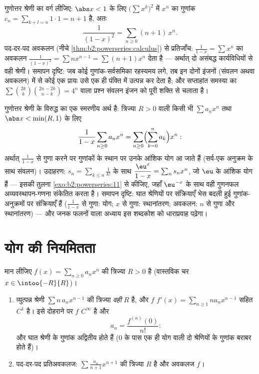 \begin{example}[एक कोशी वर्ग, प्रतिजाँच सहित]\label{ex:b2:powerseries:cauchysquare}
गुणोत्तर श्रेणी का वर्ग लीजिए: $\abs x < 1$ के लिए $\bigl(\sum x^k\bigr)^2$ में $x^n$ का गुणांक $c_n = \sum_{k+l=n}
1\cdot1 = n + 1$ है,
अतः
\[
\frac{1}{(1-x)^2} = \sum_{n\geq0}(n+1)\,x^n .
\]
पद-दर-पद अवकलन (नीचे \cref{thm:b2:powerseries:calculus}) से प्रतिजाँच: $\frac{1}{1-x} = \sum x^n$ का अवकलन $\frac{1}{(1-x)^2} = \sum
nx^{n-1} = \sum(n+1)x^n$ देता है ---
अर्थात् दो असंबद्ध कार्यविधियों से वही श्रेणी। समापन दृष्टि: जब कोई
गुणांक-सर्वसमिका रहस्यमय लगे, तब इन दोनों इंजनों (संवलन अथवा अवकलन) में से
कोई एक प्रायः उसे एक ही पंक्ति में उत्पन्न कर देता है; और सप्ताहांत समस्या
का $\sum\binom{2k}k\binom{2n-2k}{n-k} = 4^n$ वाला प्रश्न संवलन इंजन को पूरी शक्ति से चलाता है।
\end{example}

\begin{example}\label{ex:b2:powerseries:partialsums}
गुणोत्तर श्रेणी के विरुद्ध  का एक स्मरणीय अर्थ है: त्रिज्या
$R > 0$ वाली किसी भी $\sum a_nx^n$ तथा $\abs x <
\min(R, 1)$ के लिए
\[
\frac{1}{1-x}\sum_{n\geq0}a_nx^n
= \sum_{n\geq0}\Bigl(\sum_{k=0}^{n}a_k\Bigr)x^n :
\]
अर्थात् $\frac{1}{1-x}$ से गुणा करने पर गुणांकों के स्थान पर उनके आंशिक योग आ जाते हैं
(सर्व-एक अनुक्रम के साथ संवलन)। उदाहरण: $s_n =
\sum_{k\leq n}\frac{1}{k!}$ के साथ $\dfrac{\eu^x}{1-x} = \sum_n s_n x^n$, जो $\eu$ के आंशिक
योग हैं --- इसकी तुलना \cref{exo:b2:powerseries:11} से कीजिए, जहाँ $\eu^{-x}$ के साथ वही गुणनफल
अव्यवस्थापन-गणना संकेतित करता है। समापन दृष्टि: घात श्रेणियों पर संक्रियाएँ
भेस बदली हुई गुणांक-अनुक्रमों पर संक्रियाएँ हैं ($\frac1{1-x}$ से गुणा: योग; $x$ से
गुणा: स्थानांतरण; अवकलन: $n$ से गुणा और स्थानांतरण) --- और जनक फलनों वाला
अध्याय इस शब्दकोश को धाराप्रवाह पढ़ेगा।
\end{example}

\section{योग की नियमितता}

\begin{theorem}[पद-दर-पद कलन]\label{thm:b2:powerseries:calculus}
मान लीजिए $f(x) = \sum_{n\geq0} a_n x^n$ की त्रिज्या $R > 0$ है (वास्तविक चर $x \in \intoo{-R}{R}$)।
\begin{enumerate}
  \item व्युत्पन्न श्रेणी $\sum n\,a_n x^{n-1}$ की त्रिज्या \emph{वही} $R$ है, और $f$ $f'(x) = \sum_{n \geq 1}
        n a_n x^{n-1}$
        सहित $C^1$ है। इसे दोहराने पर $f$ $C^\infty$ है और
        \[
        a_n = \frac{f^{(n)}(0)}{n!} :
        \]
        और घात श्रेणी के गुणांक अद्वितीय होते हैं ($0$ के पास एक ही योग
        वाली दो श्रेणियों के गुणांक बराबर होते हैं)।
  \item पद-दर-पद प्रतिअवकलज: $\sum \frac{a_n}{n+1}x^{n+1}$ की त्रिज्या $R$ है और अवकलज $f$।
\end{enumerate}
\end{theorem}

